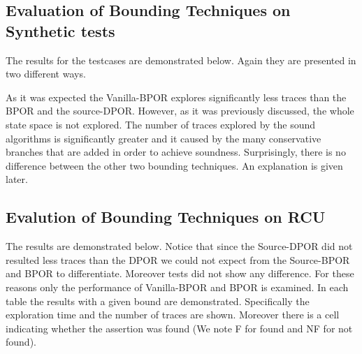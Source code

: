 \subsection{Evaluation of Bounding Techniques on Synthetic tests}

The results for the testcases are demonstrated below. Again they are presented in two different ways.


As it was expected the Vanilla-BPOR explores significantly less traces than the BPOR and the source-DPOR. However, as it was previously discussed, the whole
state space is not explored. The number of traces explored by the sound algorithms is significantly greater and it caused by the many conservative branches that are
added in order to achieve soundness. Surprisingly, there is no difference between the other two bounding techniques. An explanation is given later.

\subsection{Evalution of Bounding Techniques on RCU}
The results are demonstrated below. Notice that since the Source-DPOR did not resulted less traces than the DPOR we could not expect from the Source-BPOR and BPOR
to differentiate. Moreover tests did not show any difference. For these reasons only the performance of Vanilla-BPOR and BPOR is examined. In each table
the results with a given bound are demonstrated. Specifically the exploration time and the number of traces are shown. 
Moreover there is a cell indicating whether the assertion was found (We note F for found and NF for not found).


